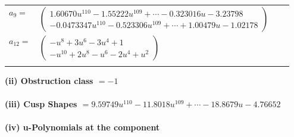 \documentclass[1p]{elsarticle_modified}
\theoremstyle{definition}
\begin{document}
\begin{tabular}{m{7pt} m{180pt} m{7pt} m{180pt} }
\flushright $a_{9}=$&$\begin{pmatrix}1.60670 u^{110}-1.55222 u^{109}+\cdots-0.323016 u-3.23798\\-0.0473347 u^{110}-0.523306 u^{109}+\cdots+1.00479 u-1.02178\end{pmatrix}$ \\
\flushright $a_{12}=$&$\begin{pmatrix}- u^8+3 u^6-3 u^4+1\\- u^{10}+2 u^8- u^6-2 u^4+u^2\end{pmatrix}$\\&\end{tabular}
\flushleft \textbf{(ii) Obstruction class $= -1$}\\~\\
\flushleft \textbf{(iii) Cusp Shapes $= 9.59749 u^{110}-11.8018 u^{109}+\cdots-18.8679 u-4.76652$}\\~\\
\newpage\renewcommand{\arraystretch}{1}
\flushleft \textbf{(iv) u-Polynomials at the component}\newline \\
\end{document}
